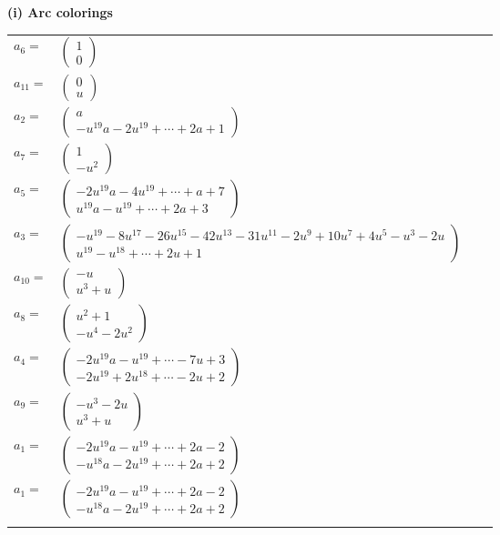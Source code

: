 \documentclass[1p]{elsarticle_modified}
\theoremstyle{definition}
\begin{document}
\flushleft \textbf{(i) Arc colorings}\\
\begin{tabular}{m{7pt} m{180pt} m{7pt} m{180pt} }
\flushright $a_{6}=$&$\begin{pmatrix}1\\0\end{pmatrix}$ \\
\flushright $a_{11}=$&$\begin{pmatrix}0\\u\end{pmatrix}$ \\
\flushright $a_{2}=$&$\begin{pmatrix}a\\- u^{19} a-2 u^{19}+\cdots+2 a+1\end{pmatrix}$ \\
\flushright $a_{7}=$&$\begin{pmatrix}1\\- u^2\end{pmatrix}$ \\
\flushright $a_{5}=$&$\begin{pmatrix}-2 u^{19} a-4 u^{19}+\cdots+a+7\\u^{19} a- u^{19}+\cdots+2 a+3\end{pmatrix}$ \\
\flushright $a_{3}=$&$\begin{pmatrix}- u^{19}-8 u^{17}-26 u^{15}-42 u^{13}-31 u^{11}-2 u^9+10 u^7+4 u^5- u^3-2 u\\u^{19}- u^{18}+\cdots+2 u+1\end{pmatrix}$ \\
\flushright $a_{10}=$&$\begin{pmatrix}- u\\u^3+u\end{pmatrix}$ \\
\flushright $a_{8}=$&$\begin{pmatrix}u^2+1\\- u^4-2 u^2\end{pmatrix}$ \\
\flushright $a_{4}=$&$\begin{pmatrix}-2 u^{19} a- u^{19}+\cdots-7 u+3\\-2 u^{19}+2 u^{18}+\cdots-2 u+2\end{pmatrix}$ \\
\flushright $a_{9}=$&$\begin{pmatrix}- u^3-2 u\\u^3+u\end{pmatrix}$ \\
\flushright $a_{1}=$&$\begin{pmatrix}-2 u^{19} a- u^{19}+\cdots+2 a-2\\- u^{18} a-2 u^{19}+\cdots+2 a+2\end{pmatrix}$\\ \flushright $a_{1}=$&$\begin{pmatrix}-2 u^{19} a- u^{19}+\cdots+2 a-2\\- u^{18} a-2 u^{19}+\cdots+2 a+2\end{pmatrix}$\\&\end{tabular}
\end{document}
